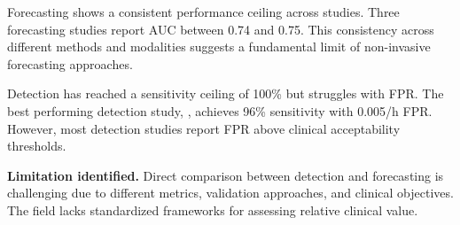 Forecasting shows a consistent performance ceiling across studies. Three forecasting studies report AUC between 0.74 and 0.75. This consistency across different methods and modalities suggests a fundamental limit of non-invasive forecasting approaches.

Detection has reached a sensitivity ceiling of 100\% but struggles with FPR. The best performing detection study, \textcite{spahrDeepLearningbasedDetection2025}, achieves 96\% sensitivity with 0.005/h FPR. However, most detection studies report FPR above clinical acceptability thresholds.

\textbf{Limitation identified.} Direct comparison between detection and forecasting is challenging due to different metrics, validation approaches, and clinical objectives. The field lacks standardized frameworks for assessing relative clinical value.
